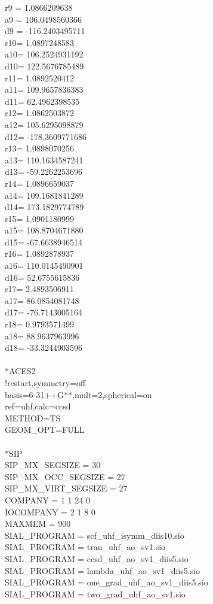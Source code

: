 \documentclass[12pt]{article}
\begin{document}
r9 =    1.0866209638\\
a9 =  106.0498560366\\
d9 = -116.2403495711\\
r10=    1.0897248583\\
a10=  106.2524931192\\
d10=  122.5676785489\\
r11=    1.0892520412\\
a11=  109.9657836383\\
d11=   62.4962398535\\
r12=    1.0862503872\\
a12=  105.6295098879\\
d12= -178.3609771686\\
r13=    1.0898070256\\
a13=  110.1634587241\\
d13=  -59.2262253696\\
r14=    1.0896659037\\
a14=  109.1681841289\\
d14=  173.1829774789\\
r15=    1.0901180999\\
a15=  108.8704671880\\
d15=  -67.6638946514\\
r16=    1.0892878937\\
a16=  110.0145490901\\
d16=   52.6755615836\\
r17=    2.4893506911\\
a17=   86.0854081748\\
d17=  -76.7143005164\\
r18=    0.9793571499\\
a18=   88.9637963996\\
d18=  -33.3244903596\\ 
\\
$*$ACES2\\ 
!restart,symmetry=off\\ 
basis=6-31++G$*$$*$,mult=2,spherical=on\\
ref=uhf,calc=ccsd\\
METHOD=TS\\ 
GEOM\_OPT=FULL\\ 
\\
$*$SIP\\ 
SIP\_MX\_SEGSIZE      = 30\\
SIP\_MX\_OCC\_SEGSIZE  = 27\\
SIP\_MX\_VIRT\_SEGSIZE = 27\\
COMPANY   = 1 1 24 0\\
IOCOMPANY = 2 1  8 0\\
MAXMEM    = 900\\
SIAL\_PROGRAM = scf\_uhf\_isymm\_diis10.sio\\ 
SIAL\_PROGRAM = tran\_uhf\_ao\_sv1.sio\\ 
SIAL\_PROGRAM = ccsd\_uhf\_ao\_sv1\_diis5.sio\\ 
SIAL\_PROGRAM = lambda\_uhf\_ao\_sv1\_diis5.sio\\ 
SIAL\_PROGRAM = one\_grad\_uhf\_ao\_sv1\_diis5.sio\\ 
SIAL\_PROGRAM = two\_grad\_uhf\_ao\_sv1.sio\\ 
 
\end{document}
